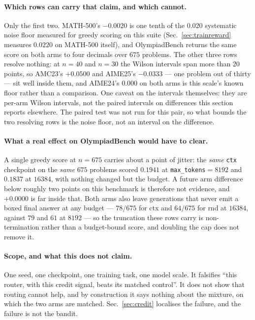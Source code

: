 \paragraph{Which rows can carry that claim, and which cannot.} Only the first two. MATH-500's
$-0.0020$ is one tenth of the $0.020$ systematic noise floor measured for greedy scoring on
this suite (Sec.~\ref{sec:trainreward} measures $0.0220$ on MATH-500 itself), and
OlympiadBench returns the same score on both arms to four decimals over $675$ problems. The other three rows resolve nothing: at $n=40$ and $n=30$ the Wilson intervals span
more than $20$ points, so AMC23's $+0.0500$ and AIME25's $-0.0333$ --- one problem out of
thirty --- sit well inside them, and AIME24's $0.000$ on both arms is this scale's known floor
rather than a comparison. One caveat on the intervals themselves: they are per-arm Wilson
intervals, not the paired intervals on differences this section reports elsewhere. The paired
test was not run for this pair, so what bounds the two resolving rows is the noise floor, not
an interval on the difference.

\paragraph{What a real effect on OlympiadBench would have to clear.} A single greedy score at
$n=675$ carries about a point of jitter: the \emph{same} \texttt{ctx} checkpoint on the
\emph{same} $675$ problems scored $0.1941$ at \texttt{max\_tokens}${=}8192$ and $0.1837$ at
$16384$, with nothing changed but the budget. A future arm difference below roughly two points
on this benchmark is therefore not evidence, and $+0.0000$ is far inside that. Both arms also
leave generations that never emit a boxed final answer at any budget --- $78/675$ for ctx and
$64/675$ for rnd at $16384$, against $79$ and $61$ at $8192$ --- so the truncation these rows
carry is non-termination rather than a budget-bound score, and doubling the cap does not
remove it.

\paragraph{Scope, and what this does not claim.} One seed, one checkpoint, one training task,
one model scale. It falsifies ``this router, with this credit signal, beats its matched
control''. It does not show that routing cannot help, and by construction it says nothing
about the mixture, on which the two arms are matched. Sec.~\ref{sec:credit} localises the
failure, and the failure is not the bandit.

